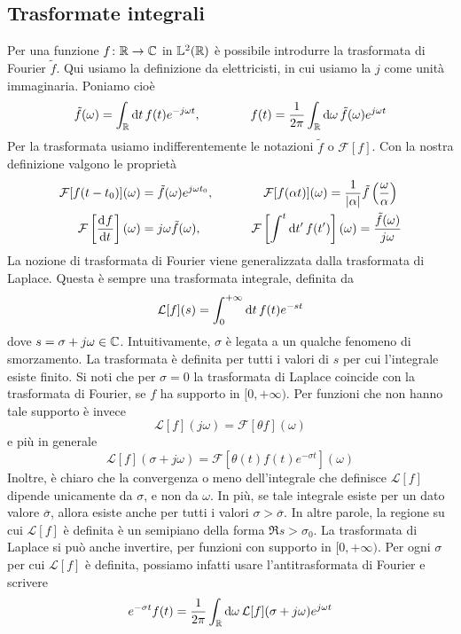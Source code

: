 \documentclass[a4paper, 11pt]{article}
\begin{document}
	\subsection{Trasformate integrali}
	Per una funzione $f\colon\mathbb{R} \to\mathbb{C} $ in $\mathbb{L}^2(\mathbb{R})$ è possibile introdurre la trasformata di Fourier $\tilde{f}$. Qui usiamo la definizione da elettricisti, in cui usiamo la $j$ come unità immaginaria. Poniamo cioè
	\[\tilde{f}(\omega)=\int_{\mathbb{R}}\mathrm{d} t\,f(t)e^{-j\omega t},\qquad\qquad f(t)=\frac{1}{2\pi}\int_{\mathbb{R}}\mathrm{d} \omega\,\tilde{f}(\omega)e^{j\omega t}\]
	Per la trasformata usiamo indifferentemente le notazioni $\tilde{f}$ o $\mathcal{F}[f]$. Con la nostra definizione valgono le proprietà
	\begin{align*}
		\mathcal{F}[f(t-t_0)](\omega)&=\tilde{f}(\omega)e^{j\omega t_0},\qquad\qquad\mathcal{F}[f(\alpha t)](\omega)=\frac{1}{|\alpha|}\tilde{f}\left(\frac{\omega}{\alpha}\right)\\
		\mathcal{F}\left[\dfrac{\mathrm{d} ^{}f}{\mathrm{d} {t}^{}}\right](\omega)&=j\omega \tilde{f}(\omega),\qquad\qquad\mathcal{F}\left[\int^t\mathrm{d} t'\,f(t')\right](\omega)=\frac{\tilde{f}(\omega)}{j\omega}
	\end{align*}
	La nozione di trasformata di Fourier viene generalizzata dalla trasformata di Laplace. Questa è sempre una trasformata integrale, definita da
	\[\mathcal{L}[f](s)=\int_{0}^{+\infty}\mathrm{d} t\, f(t)e^{-st}\]
	dove $s=\sigma+j\omega\in\mathbb{C}$. Intuitivamente, $\sigma$ è legata a un qualche fenomeno di smorzamento. La trasformata è definita per tutti i valori di $s$ per cui l'integrale esiste finito. Si noti che per $\sigma=0$ la trasformata di Laplace coincide con la trasformata di Fourier, se $f$ ha supporto in $[0,+\infty)$. Per funzioni che non hanno tale supporto è invece
	\[\mathcal{L}[f](j\omega)=\mathcal{F}[\theta f](\omega)\]
	e più in generale
	\[\mathcal{L}[f](\sigma+j\omega)=\mathcal{F}[\theta(t)f(t)e^{-\sigma t}](\omega)\]
	Inoltre, è chiaro che la convergenza o meno dell'integrale che definisce $\mathcal{L}[f]$ dipende unicamente da $\sigma$, e non da $\omega$. In più, se tale integrale esiste per un dato valore $\overline{\sigma}$, allora esiste anche per tutti i valori $\sigma>\overline{\sigma}$. In altre parole, la regione su cui $\mathcal{L}[f]$ è definita è un semipiano della forma $\Re s>\sigma_0$. La trasformata di Laplace si può anche invertire, per funzioni con supporto in $[0,+\infty)$. Per ogni $\sigma$ per cui $\mathcal{L}[f]$ è definita, possiamo infatti usare l'antitrasformata di Fourier e scrivere
	\[e^{-\sigma t}f(t)=\frac{1}{2\pi}\int_{\mathbb{R}}\mathrm{d} \omega\,\mathcal{L}[f](\sigma+j\omega)e^{j\omega t}\]
\end{document}
